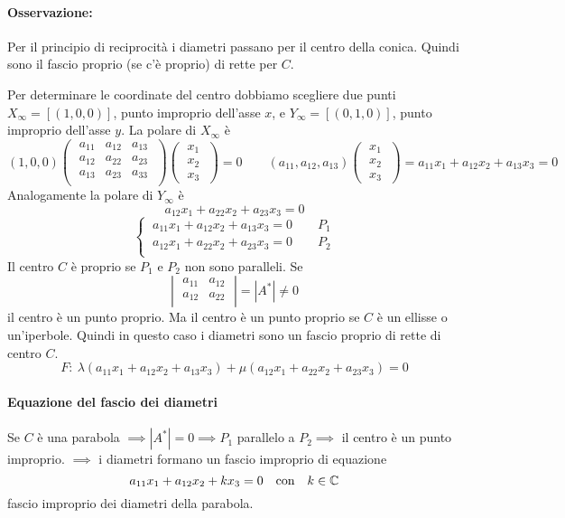 \paragraph{Osservazione:} Per il principio di reciprocità i diametri passano per il centro della conica. Quindi sono il fascio proprio (se c'è proprio) di rette per \(C\).

Per determinare le coordinate del centro dobbiamo scegliere due punti \(X_{\infty} = [(1, 0, 0)]\), punto improprio dell'asse \(x\), e \(Y_{\infty} = [(0,1,0)]\), punto improprio dell'asse \(y\). La polare di \(X_{\infty}\) è \[
    (1,0,0)
\left( \; \begin{matrix}
    a_{11} & a_{12} & a_{13} \\
    a_{12} & a_{22} & a_{23} \\
    a_{13} & a_{23} & a_{33} \\
\end{matrix} \; \right)
\left( \; \begin{matrix} x_1 \\ x_2\\ x_3 \end{matrix} \; \right) = 0 \qquad (a_{11}, a_{12}, a_{13}) \left( \; \begin{matrix} x_1 \\ x_2\\ x_3 \end{matrix} \; \right) = a_{11}x_1+a_{12}x_2 + a_{13} x_3 = 0
\] Analogamente la polare di \(Y_{\infty}\) è  \[
a_{12}x_1 + a_{22}x_2 + a_{23}x_3 = 0
\] \[
\begin{cases}
    \ a_{11}x_1+a_{12}x_2+a_{13}x_3 = 0 \qquad P_1 \\
    \ a_{12}x_1+a_{22}x_2+a_{23}x_3=0 \qquad P_2 \\
\end{cases}
\] 
Il centro \(C\) è proprio se \(P_1\) e \(P_2\) non sono paralleli. Se \[
\left| \; \begin{matrix}
    a_{11} & a_{12} \\
    a_{12} & a_{22} \\
\end{matrix} \; \right| = |A^{*}| \neq 0
\] il centro è un punto proprio. Ma il centro è un punto proprio se \(C\) è un ellisse o un'iperbole. Quindi in questo caso i diametri sono un fascio proprio di rette di centro \(C\). \[
F: \ \lambda (a_{11}x_1+a_{12}x_2+a_{13}x_3) + \mu (a_{12}x_1 + a_{22}x_2 + a_{23}x_3) = 0
\] \paragraph{Equazione del fascio dei diametri} Se \(C\) è una parabola \(\implies |A^{*}| = 0 \implies P_1 \) parallelo a \(P_2 \implies  \) il centro è un punto improprio. \(\implies \) i diametri formano un fascio improprio di equazione \[
a_{11}x_1+a_{12}x_2 + kx_3 = 0 \quad \text{con} \quad k \in \CC
\] fascio improprio dei diametri della parabola.

